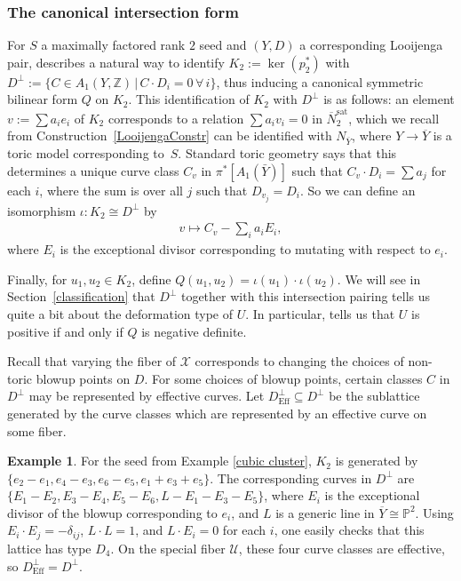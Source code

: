 \documentclass[pdftex]{sigma}
\numberwithin{equation}{section}
\numberwithin{figure}{section}
\numberwithin{table}{section}
\DeclareMathOperator{\Eff}{Eff}
\DeclareMathOperator{\sat}{sat}
\let\?=\overline
\let\bb=\mathbb
\let\rar=\rightarrow
\let\s=\mathcal
\theoremstyle{definition}
\newtheorem{eg}[thm]{Example}
\begin{document}
\subsubsection{The canonical intersection form}\label{canonical intersection}

For $S$ a maximally factored rank $2$ seed and $(Y,D)$ a corresponding Looijenga pair, \cite{GHK3} describes a natural way to identify $K_2:=\ker(p_2^*)$ with $D^{\perp}:=\{C\in A_1(Y,\bb{Z})\,|\,C\cdot D_i =0 \,\forall\,i\}$, thus inducing a canonical symmetric bilinear form $Q$ on $K_2$. This identification of $K_2$ with $D^{\perp}$ is as follows: an element $v:=\sum a_i e_i$ of $K_2$ corresponds to a relation $\sum a_{i} v_i = 0$ in $\?{N}_2^{\sat}$, which we recall from Construction~\ref{LooijengaConstr} can be identified with $N_{\?{Y}}$, where $Y\rar \?{Y}$ is a toric model corresponding to~$S$. Standard toric geometry says that this determines a unique curve class $C_v$ in $\pi^{*}[A_1(\bar{Y})]$ such that $C_v\cdot D_i = \sum a_{j}$ for each $i$, where the sum is over all $j$ such that $D_{v_j}=D_i$. So we can define an isomorphism $\iota\colon K_2 \cong D^{\perp}$ by
\begin{gather*}
	v\mapsto C_v - \sum_i a_{i} E_{i},
\end{gather*}
where $E_i$ is the exceptional divisor corresponding to mutating with respect to $e_i$.

Finally, for $u_1,u_2 \in K_2$, define $Q(u_1,u_2) = \iota(u_1) \cdot \iota(u_2)$. We will see in Section~\ref{classification} that $D^{\perp}$ together with this intersection pairing tells us quite a bit about the deformation type of $U$. In particular, \cite{GHK3} tells us that $U$ is positive if and only if $Q$ is negative definite.

Recall that varying the fiber of $\s{X}$ corresponds to changing the choices of non-toric blowup points on $D$. For some choices of blowup points, certain classes $C$ in $D^{\perp}$ may be represented by effective curves. Let $D^{\perp}_{\Eff} \subseteq D^{\perp}$ be the sublattice generated by the curve classes which are represented by an effective curve on some fiber.

\begin{eg}For the seed from Example \ref{cubic cluster}, $K_2$ is generated by $\{e_2-e_1,e_4-e_3,e_6-e_5,e_1+e_3+e_5\}$. The corresponding curves in $D^{\perp}$ are $\{E_1-E_2,E_3-E_4,E_5-E_6,L-E_1-E_3-E_5\}$, where $E_i$ is the exceptional divisor of the blowup corresponding to $e_i$, and $L$ is a generic line in $\?{Y}\cong \bb{P}^2$. Using $E_i\cdot E_j = -\delta_{ij}$, $L\cdot L=1$, and $L\cdot E_i=0$ for each $i$, one easily checks that this lattice has type $D_4$. On the special fiber $\s{U}$, these four curve classes are effective, so $D^{\perp}_{\Eff} = D^{\perp}$.
\end{eg}
\end{document}

